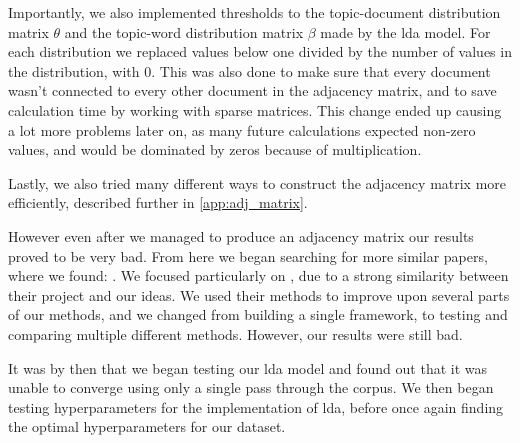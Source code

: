 Importantly, we also implemented thresholds to the topic-document distribution matrix $\theta$ and the topic-word distribution matrix $\beta$ made by the \gls{lda} model.
For each distribution we replaced values below one divided by the number of values in the distribution, with 0.
This was also done to make sure that every document wasn't connected to every other document in the adjacency matrix, and to save calculation time by working with sparse matrices.
This change ended up causing a lot more problems later on, as many future calculations expected non-zero values, and would be dominated by zeros because of multiplication.

Lastly, we also tried many different ways to construct the adjacency matrix more efficiently, described further in \autoref{app:adj_matrix}.

However even after we managed to produce an adjacency matrix our results proved to be very bad.
From here we began searching for more similar papers, where we found: .
We focused particularly on , due to a strong similarity between their project and our ideas.
We used their methods to improve upon several parts of our methods, and we changed from building a single framework, to testing and comparing multiple different methods. 
However, our results were still bad.

It was by then that we began testing our \gls{lda} model and found out that it was unable to converge using only a single pass through the corpus. 
We then began testing hyperparameters for the implementation of \gls{lda}, before once again finding the optimal hyperparameters for our dataset.
